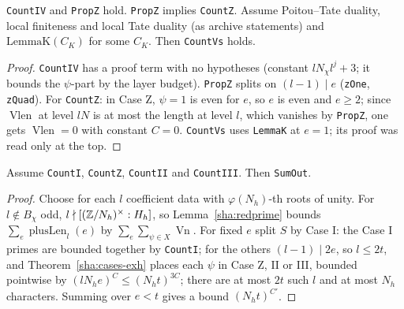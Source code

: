 \begin{lemma}\label{sha:easy-cases}
\texttt{CountIV} and \texttt{PropZ} hold. \texttt{PropZ} implies \texttt{CountZ}. Assume
Poitou--Tate duality, local finiteness and local Tate duality (as archive statements) and
$\mathrm{LemmaK}(C_K)$ for some $C_K$. Then \texttt{CountVs} holds.
\end{lemma}
\begin{proof}
\texttt{CountIV} has a proof term with no hypotheses (constant $l N_{\chi} l^j+3$; it bounds
the $\psi$-part by the layer budget). \texttt{PropZ} splits on $(l-1)\mid e$ (\texttt{zOne},
\texttt{zQuad}). For \texttt{CountZ}: in Case Z, $\psi=1$ is even for $e$, so $e$ is even and
$e\ge2$; since $\operatorname{Vlen}$ at level $lN$ is at most the length at level $l$, which
vanishes by \texttt{PropZ}, one gets $\operatorname{Vlen}=0$ with constant $C=0$.
\texttt{CountVs} uses \texttt{LemmaK} at $e=1$; its proof was read only at the top.
\end{proof}

\begin{lemma}\label{sha:sumout}
Assume \texttt{CountI}, \texttt{CountZ}, \texttt{CountII} and \texttt{CountIII}. Then \texttt{SumOut}.
\end{lemma}
\begin{proof}
Choose for each $l$ coefficient data with $\varphi(N_h)$-th roots of unity. For $l\notin
B_{\chi}$ odd, $l\nmid[(\mathbb{Z}/N_h)^{\times}:H_h]$, so Lemma~\ref{sha:redprime} bounds
$\sum_e\operatorname{plusLen}_l(e)$ by $\sum_e\sum_{\psi\in X}\operatorname{Vn}$. For fixed $e$
split $S$ by Case I: the Case I primes are bounded together by \texttt{CountI}; for the
others $(l-1)\mid2e$, so $l\le2t$, and Theorem~\ref{sha:cases-exh} places each $\psi$ in Case
Z, II or III, bounded pointwise by $(lN_he)^C\le(N_ht)^{3C}$; there are at most $2t$ such $l$
and at most $N_h$ characters. Summing over $e<t$ gives a bound $(N_ht)^{C'}$.
\end{proof}

